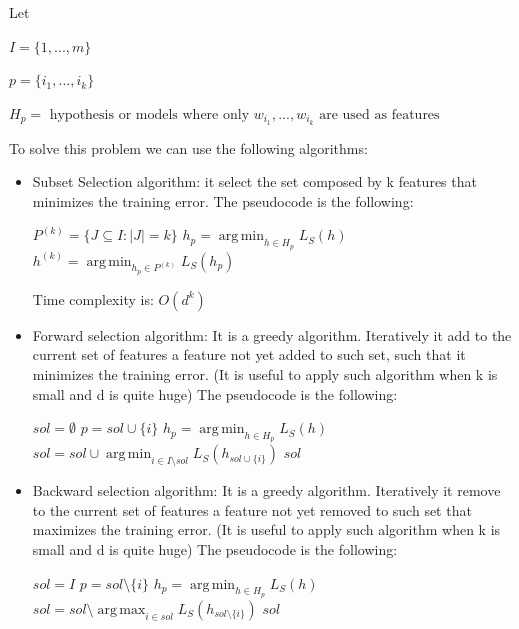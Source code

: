 \documentclass[a4paper,11pt,oneside]{book}
\DeclareMathOperator*{\argmax}{arg\,max}
\DeclareMathOperator*{\argmin}{arg\,min}
\begin{document}
\begin{enumerate}
\begin{solution}
    Let
    \begin{center}
    $I = \{1,...,m\}$

    $p = \{i_1,...,i_k\}$

    $H_p = \text{ hypothesis or models where only } w_{i_1}, ..., w_{i_k} \text{ are used as features}$
    \end{center}

    To solve this problem we can use the following\linebreak
    algorithms:
    
    \begin{itemize}
    \item Subset Selection algorithm: it select the set composed by k features that minimizes the training error.
    The pseudocode is the following:
    
    \begin{algorithmic}[1]
    \State $P^{(k)} = \{J \subseteq I : |J| = k\}$
        \State $h_p = \argmin_{h \in H_p}L_S(h)$
    \EndFor
    \State \Return $h^{(k)} = \argmin_{h_p \in P^{(k)}}L_S(h_p)$
    \end{algorithmic}
    Time complexity is: $O(d^k)$
    
    \item Forward selection algorithm: It is a greedy algorithm. Iteratively it add to the current set of features a feature not yet added to such set, such that it minimizes the training error. (It is useful to apply such algorithm when k is small and d is quite huge)
    The pseudocode is the following:
    
    \begin{algorithmic}[1]
    \State $sol = \emptyset$
            \State $p = sol \cup \{i\}$
            \State $h_p = \argmin_{h \in H_p}L_S(h)$
        \EndFor
        \State $sol = sol \cup \argmin_{i \in I\setminus sol}L_S(h_{sol\cup\{i\}})$
    \EndWhile
    \State \Return $sol$
    \end{algorithmic}
    
    \item Backward selection algorithm: It is a greedy algorithm. Iteratively it remove to the current set of features a feature not yet removed to such set that maximizes the training error. (It is useful to apply such algorithm when k is small and d is quite huge)
    The pseudocode is the following:
    
    \begin{algorithmic}[1]
    \State $sol = I$
            \State $p = sol\setminus\{i\}$
            \State $h_p = \argmin_{h \in H_p}L_S(h)$
        \EndFor
        \State $sol = sol \setminus \argmax_{i \in sol}L_S(h_{sol\setminus\{i\}})$
    \EndWhile
    \State \Return $sol$
    \end{algorithmic}
    \end{itemize}
    \end{solution}
\end{enumerate}
\end{document}
